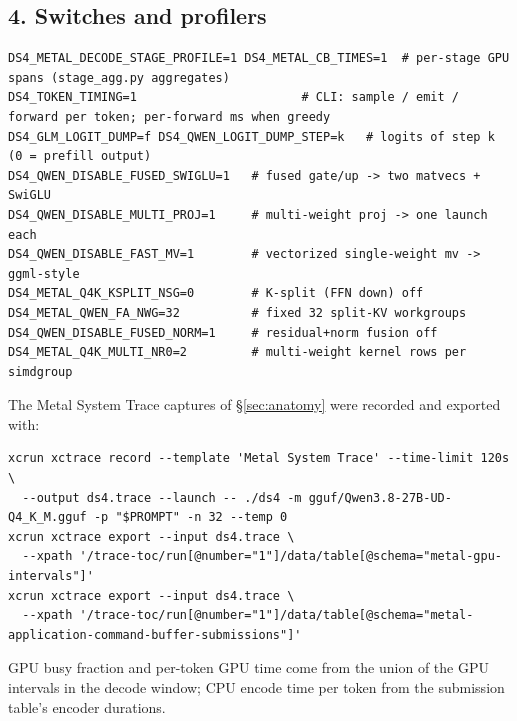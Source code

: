 \documentclass[11pt]{article}
\begin{document}
\subsection*{4. Switches and profilers}
\begin{lstlisting}
DS4_METAL_DECODE_STAGE_PROFILE=1 DS4_METAL_CB_TIMES=1  # per-stage GPU spans (stage_agg.py aggregates)
DS4_TOKEN_TIMING=1                       # CLI: sample / emit / forward per token; per-forward ms when greedy
DS4_GLM_LOGIT_DUMP=f DS4_QWEN_LOGIT_DUMP_STEP=k   # logits of step k (0 = prefill output)
DS4_QWEN_DISABLE_FUSED_SWIGLU=1   # fused gate/up -> two matvecs + SwiGLU
DS4_QWEN_DISABLE_MULTI_PROJ=1     # multi-weight proj -> one launch each
DS4_QWEN_DISABLE_FAST_MV=1        # vectorized single-weight mv -> ggml-style
DS4_METAL_Q4K_KSPLIT_NSG=0        # K-split (FFN down) off
DS4_METAL_QWEN_FA_NWG=32          # fixed 32 split-KV workgroups
DS4_QWEN_DISABLE_FUSED_NORM=1     # residual+norm fusion off
DS4_METAL_Q4K_MULTI_NR0=2         # multi-weight kernel rows per simdgroup
\end{lstlisting}
The Metal System Trace captures of \S\ref{sec:anatomy} were recorded and
exported with:
\begin{lstlisting}
xcrun xctrace record --template 'Metal System Trace' --time-limit 120s \
  --output ds4.trace --launch -- ./ds4 -m gguf/Qwen3.8-27B-UD-Q4_K_M.gguf -p "$PROMPT" -n 32 --temp 0
xcrun xctrace export --input ds4.trace \
  --xpath '/trace-toc/run[@number="1"]/data/table[@schema="metal-gpu-intervals"]'
xcrun xctrace export --input ds4.trace \
  --xpath '/trace-toc/run[@number="1"]/data/table[@schema="metal-application-command-buffer-submissions"]'
\end{lstlisting}
GPU busy fraction and per-token GPU time come from the union of the GPU
intervals in the decode window; CPU encode time per token from the submission
table's encoder durations.
\end{document}
